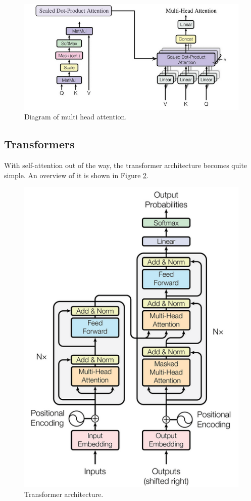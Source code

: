       \begin{figure}[H]
        \centering 
        \includegraphics[scale=1.5]{img/10_Attention/multi_head_attention.png}
        \caption{Diagram of multi head attention. } 
        \label{fig:multi_head_attention}
      \end{figure}

  \subsection{Transformers} 

      With self-attention out of the way, the transformer architecture becomes quite simple. An overview of it is shown in Figure \ref{fig:transformer}. 

      \begin{figure}[H]
        \centering 
        \includegraphics[scale=1.3]{img/10_Attention/transformer.png}
        \caption{Transformer architecture. } 
        \label{fig:transformer}
      \end{figure}

